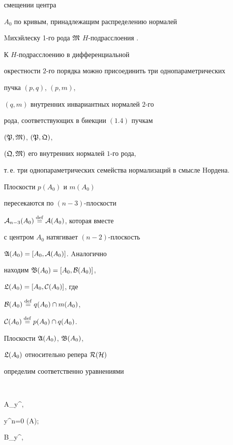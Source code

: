 смещении центра


$A_0$ по кривым, принадлежащим распределению нормалей


Mихэйлеску 1-го рода $\frak M$\; $H$-подрасслоения \cite{rab7}.





\begin{thm}


К $H$-подрасслоению в дифференциальной


окрестности $2$-го порядка можно присоединить три однопараметрических


пучка $(p,q)$, $(p,m)$,


$(q, m)$ внутренних инвариантных нормалей $2$-го


рода, соответствующих в биекции $(1.4)$ пучкам


$(\frak P, \frak M)$, $(\frak P, \frak Q)$,


$(\frak Q,\frak M)$ его внутренних нормалей $1$-го рода,


т.\,е. три однопараметрических семейства нормализаций в смысле Hордена.


\end{thm}





Плоскости $p(A_0)$ и $m(A_0)$


пересекаются по $(n-3)$-плоскости


${\cal A}_{n-3}(A_0) \overset{\mathrm{def}}{=}{} {\cal A} (A_0)$, которая вместе


с центром $A_0$ натягивает $(n-2)$-плоскость


$\frak A (A_0) = [A_0, {\cal A}(A_0)]$. Aналогично


находим $\frak B (A_0) = [A_0, {\cal B}(A_0)]$,


$\frak L (A_0) = [A_0, {\cal C}(A_0)]$, где


${\cal B} (A_0) \overset{\mathrm{def}}{=}{} q(A_0) \cap m(A_0)$,


${\cal C} (A_0) \overset{\mathrm{def}}{=}{} p(A_0) \cap q(A_0)$.


Плоскости $\frak A (A_0)$, $\frak B (A_0)$,


$\frak L (A_0)$ относительно репера $\cal R(\cal H)$


определим соответственно уравнениями


$$


\frak A_\sigma y^,\ \;


y^n=0 (\frak A);\ \;


\frak B_\sigma y^,\ \;


